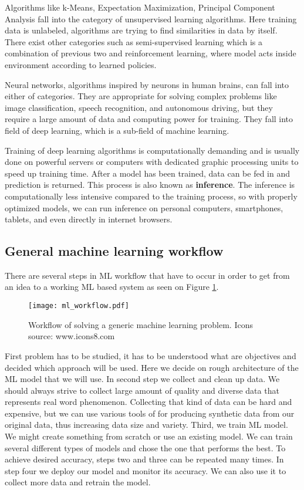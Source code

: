 Algorithms like k-Means, Expectation Maximization, Principal Component Analysis fall into the category of unsupervised learning algorithms.
Here training data is unlabeled, algorithms are trying to find similarities in data by itself\cite{geron}.
There exist other categories such as semi-supervised learning which is a combination of previous two and reinforcement learning, where model acts inside environment according to learned policies\cite{geron}.

Neural networks, algorithms inspired by neurons in human brains\cite{geron}\cite{cs231n}, can fall into either of categories. 
They are appropriate for solving complex problems like image classification, speech recognition, and autonomous driving, but they require a large amount of data and computing power for training.
They fall into field of deep learning, which is a sub-field of machine learning.

Training of deep learning algorithms is computationally demanding and is usually done on powerful servers or computers with dedicated graphic processing units to speed up training time.
After a model has been trained, data can be fed in and prediction is returned. 
This process is also known as \textbf{inference}.
The inference is computationally less intensive compared to the training process, so with properly optimized models, we can run inference on personal computers, smartphones, tablets, and even directly in internet browsers.


\subsection{ General machine learning workflow}

There are several steps in ML workflow that have to occur in order to get from an idea to a working ML based system as seen on Figure \ref{ml_workflow}.

\begin{figure}[ht]
        \centering
        \texttt{[image: ml\_workflow.pdf]} 
        \caption{ Workflow of solving a generic machine learning problem. Icons source: www.icons8.com}
        \label{ml_workflow}
\end{figure}

First problem has to be studied, it has to be understood what are objectives and decided which approach will be used. 
Here we decide on rough architecture of the ML model that we will use.
In second step we collect and clean up data.
We should always strive to collect large amount of quality and diverse data that represents real word phenomenon.
Collecting that kind of data can be hard and expensive, but we can use various tools of for producing synthetic data from our original data, thus increasing data size and variety.
Third, we train ML model.
We might create something from scratch or use an existing model. 
We can train several different types of models and chose the one that performs the best.
To achieve desired accuracy, steps two and three can be repeated many times.
In step four we deploy our model and monitor its accuracy. We can also use it to collect more data and retrain the model.

